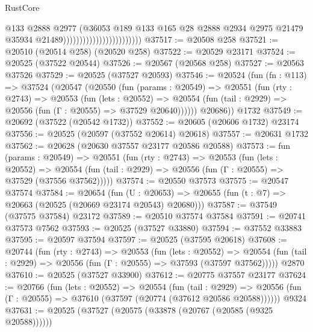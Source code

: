 \begin{lexlean}{RustCore}
\begin{coremodule}
                                                  @133
                                                  @2888
                                                  @2977
                                                  (@36053
                                                    @189
                                                    @133
                                                    @165
                                                    @28
                                                    @2888
                                                    @2934
                                                    @2975
                                                    @21479
                                                    @35934
                                                    @21489))))))))))))))))))))))))
@37517 := @20508 @258
@37521 := @20510 (@20514 @258) (@20520 @258)
@37522 := @20529 @23171
@37524 := @20525 (@37522 @20544)
@37526 := @20567 (@20568 @258)
@37527 := @20563 @37526
@37529 := @20525 (@37527 @20593)
@37546 := @20524
    (fun (fn : @113) =>
    @37524
      (@20547
        (@20550
          (fun (params : @20549) =>
          @20551
            (fun (rty : @2743) =>
            @20553
              (fun (lets : @20552) =>
              @20554 (fun (tail : @2929) => @20556 (fun (Γ : @20555) => @37529 @20640))))))
        @20686))
    @1732
@37549 := @20692 (@37522 (@20542 @1732))
@37552 := @20605 (@20606 @1732) @23174
@37556 := @20525 (@20597 (@37552 @20614) @20618)
@37557 := @20631 @1732
@37562 := @20628 (@20630 @37557 @23177 @20586 @20588)
@37573 := fun (params : @20549) =>
  @20551
    (fun (rty : @2743) =>
    @20553
      (fun (lets : @20552) =>
      @20554 (fun (tail : @2929) => @20556 (fun (Γ : @20555) => @37529 (@37556 @37562)))))
@37574 := @20550 @37573
@37575 := @20547 @37574
@37584 := @20654
    (fun (U : @20653) => @20655 (fun (t : @7) => @20663 (@20525 (@20669 @23174 @20543) @20680)))
@37587 := @37549 (@37575 @37584) @23172
@37589 := @20510 @37574 @37584
@37591 := @20741 @37573 @7562
@37593 := @20525 (@37527 @33880)
@37594 := @37552 @33883
@37595 := @20597 @37594
@37597 := @20525 (@37595 @20618)
@37608 := @20744
    (fun (rty : @2743) =>
    @20553
      (fun (lets : @20552) =>
      @20554 (fun (tail : @2929) => @20556 (fun (Γ : @20555) => @37593 (@37597 @37562)))))
    @2870
@37610 := @20525 (@37527 @33900)
@37612 := @20775 @37557 @23177
@37624 := @20766
    (fun (lets : @20552) =>
    @20554
      (fun (tail : @2929) =>
      @20556 (fun (Γ : @20555) => @37610 (@37597 (@20774 (@37612 @20586 @20588))))))
    @9324
@37631 := @20525 (@37527 (@20575 (@33878 (@20767 (@20585 (@9325 @20588))))))

\end{coremodule}
\end{lexlean}
